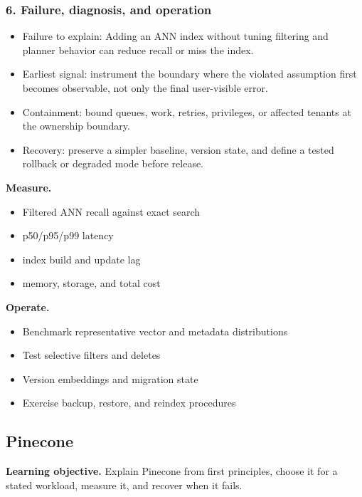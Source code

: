 \subsubsection*{6. Failure, diagnosis, and operation}
\begin{itemize}
\item Failure to explain: Adding an ANN index without tuning filtering and planner behavior can reduce recall or miss the index.
\item Earliest signal: instrument the boundary where the violated assumption first becomes observable, not only the final user-visible error.
\item Containment: bound queues, work, retries, privileges, or affected tenants at the ownership boundary.
\item Recovery: preserve a simpler baseline, version state, and define a tested rollback or degraded mode before release.
\end{itemize}
\textbf{Measure.}\begin{itemize}
\item Filtered ANN recall against exact search
\item p50/p95/p99 latency
\item index build and update lag
\item memory, storage, and total cost
\end{itemize}
\textbf{Operate.}\begin{itemize}
\item Benchmark representative vector and metadata distributions
\item Test selective filters and deletes
\item Version embeddings and migration state
\item Exercise backup, restore, and reindex procedures
\end{itemize}
\subsection{Pinecone}
\textbf{Learning objective.} Explain Pinecone from first principles, choose it for a stated workload, measure it, and recover when it fails.
